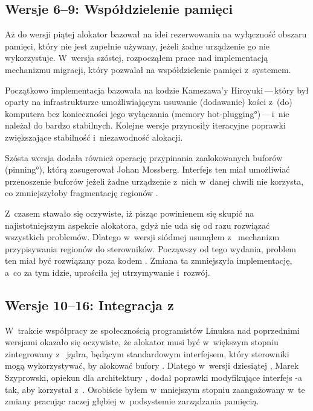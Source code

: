 \subsection{Wersje 6--9: Współdzielenie pamięci}

Aż do wersji piątej alokator  bazował na idei rezerwowania na
wyłączność obszaru pamięci, który nie jest zupełnie używany, jeżeli
żadne urządzenie go nie wykorzystuje.  W~wersja szóstej, rozpocząłem
prace nad implementacją mechanizmu migracji, który pozwalał na
współdzielenie pamięci  z~systemem.

Początkowo implementacja bazowała na kodzie Kamezawa'y
Hiroyuki\,---\,który był oparty na infrastrukturze umożliwiającym
usuwanie (dodawanie) kości  z~(do) komputera bez konieczności
jego wyłączania (\ang{memory hot-plugging})\,---\,i~nie należał do
bardzo stabilnych.  Kolejne wersje  przynosiły iteracyjne
poprawki zwiększające stabilność i~niezawodność alokacji.

Szósta wersja dodała również operację przypinania zaalokowanych
buforów (\ang{pinning}), którą zasugerował Johan Mossberg.  Interfejs
ten miał umożliwiać przenoszenie buforów  jeżeli żadne
urządzenie z~nich w~danej chwili nie korzysta, co zmniejszyłoby
fragmentację regionów .

Z~czasem stawało się oczywiste, iż pisząc  powinienem się skupić na
najistotniejszym aspekcie alokatora, gdyż nie uda się od razu
rozwiązać wszystkich problemów.  Dlatego w~wersji siódmej usunąłem
z~ mechanizm przypisywania regionów  do sterowników.  Począwszy
od tego wydania, problem ten miał być rozwiązany poza kodem .
Zmiana ta zmniejszyła implementację, a~co za tym idzie, uprościła jej
utrzymywanie i~rozwój.

\subsection{Wersje 10--16: Integracja z~ }

W~trakcie współpracy ze społecznością programistów Linuksa nad
poprzednimi wersjami  okazało się oczywiste, że alokator musi
być w~większym stopniu zintegrowany z~  jądra,
będącym standardowym interfejsem, który sterowniki mogą wykorzystywać,
by alokować bufory .  Dlatego w~wersji dziesiątej ,
Marek Szyprowski, opiekun   dla architektury
, dodał poprawki modyfikujące interfejs  -a
tak, aby korzystał z~.  Osobiście byłem w~mniejszym stopniu
zaangażowany w~te zmiany pracując raczej głębiej w~podsystemie
zarządzania pamięcią.

